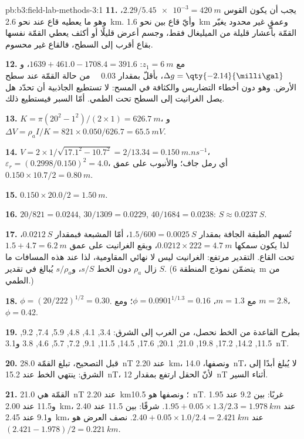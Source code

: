 \begin{solution}{pb:b3:field-lab-methods-3:1}
\textbf{11.} يجب أن يكون القوس $2.29/\num{5.45e-3} = \qty{420}{m}$، وهو ما يعطيه
قاع عند نحو \qty{2.6}{km}. وأيّ قاع بين نحو
\qty{1.6}{km} وعمقٍ غير محدود يغيّر القمّة بأعشار قليلة
من الميليغال فقط، وجسم أعرض قليلًا أو أكثف يعطي القمّة نفسها
بقاع أقرب إلى السطح، فالقاع غير محسوم.

\textbf{12.} مع $z_1 = \qty{6}{m}$: $1639 + 461.0 - 1708.4 = 391.6$،
و$\Delta g = \qty{-2.14}{\milli\gal}$، بأقلّ بمقدار \qty{0.03}{\milli\gal} من
حالة القمّة عند سطح الأرض. وهو دون أخطاء التضاريس والكثافة
في المسح: لا تستطيع الجاذبية أن تحدّد هل يصل الغرانيت
إلى السطح تحت الطمي. أمّا السبر فيستطيع ذلك.

\textbf{13.} $K = \pi(20^2 - 1^2)/(2\times1) = \qty{626.7}{m}$، و$\Delta V =
\rho_a I/K = 821\times0.050/626.7 = \qty{65.5}{mV}$.

\textbf{14.} $V = 2\times1/\sqrt{17.1^2 - 10.7^2} = 2/13.34 =
\qty{0.150}{m.ns^{-1}}$، $\varepsilon_r = (0.2998/0.150)^2 = 4.0$، أي
رمل جاف؛ والأنبوب على عمق $0.150\times10.7/2 = \qty{0.80}{m}$.

\textbf{15.} $0.150\times20.0/2 = \qty{1.50}{m}$.

\textbf{16.} $20/821 = \num{0.0244}$, $30/1309 = \num{0.0229}$, $40/1684 =
\num{0.0238}$: $S \approx \qty{0.0237}{S}$.

\textbf{17.} تُسهم الطبقة الجافة بمقدار $1.5/600 = \qty{0.0025}{S}$، أمّا
المشبعة فبمقدار $\qty{0.0212}{S}$، لذا يكون سمكها $0.0212\times222 =
\qty{4.7}{m}$، ويقع الغرانيت على عمق $1.5 + 4.7 = \qty{6.2}{m}$ تحت
القاع. التقدير مرتفع: الغرانيت ليس لا نهائي المقاومية، لذا عند هذه المسافات
ما زال $\rho_a$ دون الخط
$s/S$، و$s/\rho_a$ يُبالغ في تقدير $S$. (يتضمّن نموذج المنطقة
\qty{6}{m} من الطمي.)

\textbf{18.} $\phi = (20/222)^{1/2} = \num{0.30}$. مع $m = 1.3$، $\phi =
0.0901^{1/1.3} = \num{0.16}$؛ ومع $m = 2.8$، $\phi = \num{0.42}$.

\textbf{19.} بطرح القاعدة من الخط نحصل، من الغرب إلى الشرق:
3.4, 4.1, 4.8, 5.9, 7.4, 9.2, 11.5, 14.2, 17.2, 19.8, 21.0, 20.1, 17.6,
14.5, 11.5, 9.1, 7.2, 5.7, 4.6, 3.8 و\qty{3.1}{nT}.

\textbf{20.} قبل التصحيح، تبلغ القمّة \qty{28.0}{nT} عند \qty{2.20}{km}،
ونصفها، \qty{14.0}{nT}، لا يُبلغ أبدًا إلى الشرق: ينتهي الخط
عند \qty{15.2}{nT}، لأنّ الحقل ارتفع بمقدار \qty{12}{nT} أثناء
السير.

\textbf{21.} القمّة هي \qty{21.0}{nT} عند \qty{2.20}{km}؛ ونصفها هو
\qty{10.5}{nT}. غربًا: بين \num{9.2} عند \num{1.95} و\num{11.5} عند
\qty{2.00}{km}، عند $1.95 + 0.05\times1.3/2.3 = \qty{1.978}{km}$. شرقًا:
بين \num{11.5} عند \num{2.40} و\num{9.1} عند \qty{2.45}{km}، عند
$2.40 + 0.05\times1.0/2.4 = \qty{2.421}{km}$. نصف العرض هو $(2.421
- 1.978)/2 = \qty{0.221}{km}$.


\end{solution}

